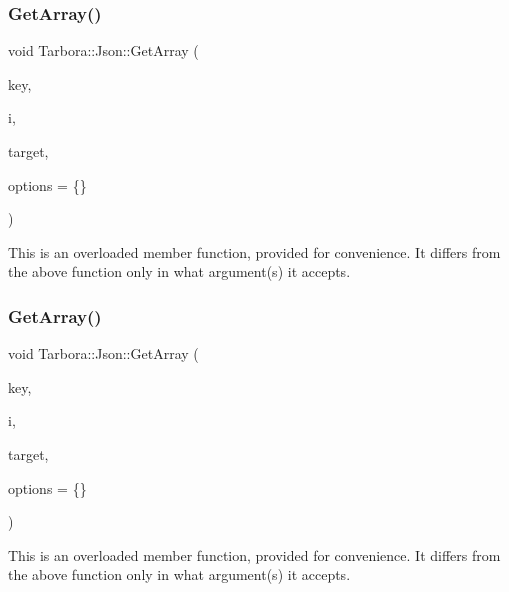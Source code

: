 \subsubsection{\texorpdfstring{Get\+Array()}{GetArray()}\hspace{0.1cm}{\footnotesize\ttfamily [5/12]}}
{\footnotesize\ttfamily void Tarbora\+::\+Json\+::\+Get\+Array (\begin{DoxyParamCaption}\item[{const char $\ast$}]{key,  }\item[{int}]{i,  }\item[{unsigned int $\ast$}]{target,  }\item[{\hyperlink{structTarbora_1_1JsonOptions}{Json\+Options}}]{options = {\ttfamily \{\}} }\end{DoxyParamCaption})}

This is an overloaded member function, provided for convenience. It differs from the above function only in what argument(s) it accepts. \mbox{\label{classTarbora_1_1Json_a28bd88966a480f75c9e115144af4c57f}} 
\subsubsection{\texorpdfstring{Get\+Array()}{GetArray()}\hspace{0.1cm}{\footnotesize\ttfamily [6/12]}}
{\footnotesize\ttfamily void Tarbora\+::\+Json\+::\+Get\+Array (\begin{DoxyParamCaption}\item[{const char $\ast$}]{key,  }\item[{int}]{i,  }\item[{std\+::string $\ast$}]{target,  }\item[{\hyperlink{structTarbora_1_1JsonOptions}{Json\+Options}}]{options = {\ttfamily \{\}} }\end{DoxyParamCaption})}

This is an overloaded member function, provided for convenience. It differs from the above function only in what argument(s) it accepts. \mbox{\label{classTarbora_1_1Json_ad14021bb52b351d19b03089267be9766}} 
